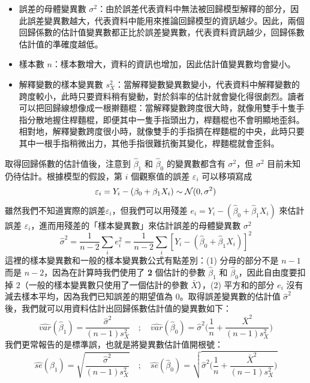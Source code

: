     \begin{itemize}
        \item 誤差的母體變異數 $\sigma^2$：由於誤差代表資料中無法被回歸模型解釋的部分，因此誤差變異數越大，代表資料中能用來推論回歸模型的資訊越少。因此，兩個回歸係數的估計值變異數都正比於誤差變異數，代表資料資訊越少，回歸係數估計值的準確度越低。
        \item 樣本數 $n$：樣本數增大，資料的資訊也增加，因此估計值變異數均會變小。
        \item 解釋變數的樣本變異數 $s_X^2$：當解釋變數變異數變小，代表資料中解釋變數的跨度較小，此時只要資料稍有變動，對於斜率的估計就會變化得很劇烈。讀者可以把回歸線想像成一根擀麵棍：當解釋變數跨度很大時，就像用雙手十隻手指分散地握住桿麵棍，即便其中一隻手指頭出力，桿麵棍也不會明顯地歪斜。相對地，解釋變數跨度很小時，就像雙手的手指擠在桿麵棍的中央，此時只要其中一根手指稍微出力，其他手指很難抗衡其變化，桿麵棍就會歪斜。
    \end{itemize}
    取得回歸係數的估計值後，注意到 $\hat{\beta}_1$ 和 $\hat{\beta}_0$ 的變異數都含有 $\sigma^2$，但 $\sigma^2$ 目前未知仍待估計。根據模型的假設，第 $i$ 個觀察值的誤差 $\varepsilon_i$ 可以移項寫成
    \[\varepsilon_i = Y_i - (\beta_0 + \beta_1 X_i) \sim \mathcal{N}(0, \sigma^2)\]
    雖然我們不知道實際的誤差$\varepsilon_i$，但我們可以用殘差 $e_i = Y_i - (\hat{\beta}_0 + \hat{\beta}_1 X_i)$ 來估計誤差 $\varepsilon_i$，進而用殘差的「樣本變異數」來估計誤差的母體變異數 $\sigma^2$
    \[\hat{\sigma}^2 = \frac{1}{n-2}\sum_i e_i^2 = \frac{1}{n-2}\sum_i [Y_i - (\hat{\beta}_0 + \hat{\beta}_1 X_i)]^2\]
    這裡的樣本變異數和一般的樣本變異數公式有點差別：(1) 分母的部分不是 $n-1$ 而是 $n-2$，因為在計算時我們使用了 \textbf{2} 個估計的參數 $\hat{\beta}_1$ 和 $\hat{\beta}_0$，因此自由度要扣掉 $2$（一般的樣本變異數只使用了一個估計的參數 $\bar{X}$），(2) 平方和的部分 $e_i$ 沒有減去樣本平均，因為我們已知誤差的期望值為 $0$。取得誤差變異數的估計值 $\hat{\sigma}^2$ 後，我們就可以用資料估計出回歸係數估計值的變異數如下：
    \[\widehat{var}(\hat{\beta}_1) = \frac{\widehat{\sigma}^2}{(n-1)s_X^2} \quad ; \quad \widehat{var}(\hat{\beta}_0) = \hat{\sigma}^2\Big(\frac{1}{n} + \frac{\bar{X}^2}{(n-1)s_X^2}\Big)\]
    我們更常報告的是標準誤，也就是將變異數估計值開根號：
    \[\widehat{se}(\hat{\beta}_1) = \sqrt{\frac{\widehat{\sigma}^2}{(n-1)s_X^2}} \quad ; \quad \widehat{se}(\hat{\beta}_0) = \sqrt{\hat{\sigma}^2\Big(\frac{1}{n} + \frac{\bar{X}^2}{(n-1)s_X^2}\Big)}\]

